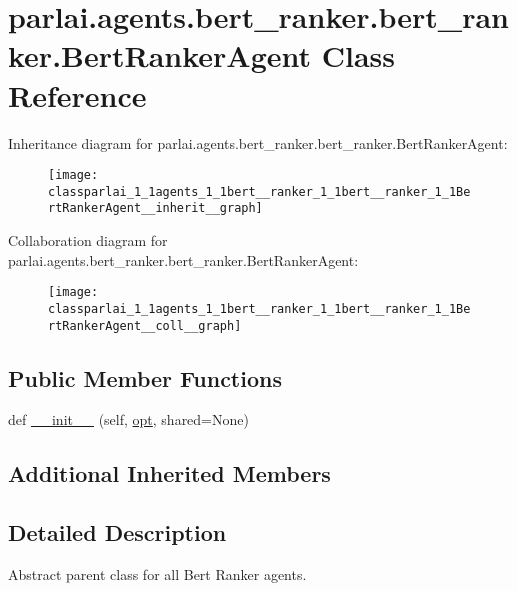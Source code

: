 \hypertarget{classparlai_1_1agents_1_1bert__ranker_1_1bert__ranker_1_1BertRankerAgent}{}\section{parlai.\+agents.\+bert\+\_\+ranker.\+bert\+\_\+ranker.\+Bert\+Ranker\+Agent Class Reference}
\label{classparlai_1_1agents_1_1bert__ranker_1_1bert__ranker_1_1BertRankerAgent}


Inheritance diagram for parlai.\+agents.\+bert\+\_\+ranker.\+bert\+\_\+ranker.\+Bert\+Ranker\+Agent\+:
\nopagebreak
\begin{figure}[H]
\begin{center}
\leavevmode
\texttt{[image: classparlai\_1\_1agents\_1\_1bert\_\_ranker\_1\_1bert\_\_ranker\_1\_1BertRankerAgent\_\_inherit\_\_graph]}
\end{center}
\end{figure}


Collaboration diagram for parlai.\+agents.\+bert\+\_\+ranker.\+bert\+\_\+ranker.\+Bert\+Ranker\+Agent\+:
\nopagebreak
\begin{figure}[H]
\begin{center}
\leavevmode
\texttt{[image: classparlai\_1\_1agents\_1\_1bert\_\_ranker\_1\_1bert\_\_ranker\_1\_1BertRankerAgent\_\_coll\_\_graph]}
\end{center}
\end{figure}
\subsection*{Public Member Functions}
\begin{DoxyCompactItemize}
\item 
def \hyperlink{classparlai_1_1agents_1_1bert__ranker_1_1bert__ranker_1_1BertRankerAgent_a1df3920ae23af044ca5abab9b0c46b10}{\+\_\+\+\_\+init\+\_\+\+\_\+} (self, \hyperlink{classparlai_1_1core_1_1torch__agent_1_1TorchAgent_a785bb920cf8c8afc3e9bf6a8b77e335a}{opt}, shared=None)
\end{DoxyCompactItemize}
\subsection*{Additional Inherited Members}


\subsection{Detailed Description}
\begin{DoxyVerb}Abstract parent class for all Bert Ranker agents.
\end{DoxyVerb}
 

